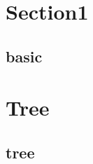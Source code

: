 \section{Section1}
    \subsection{basic}
        

\section{Tree}
    \subsection{tree}
        

        